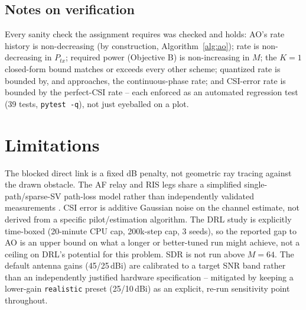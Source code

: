 \documentclass[conference]{IEEEtran}
\newcommand{\IRS}{RIS}
\begin{document}
\subsection{Notes on verification}
\label{sec:method-notes}
Every sanity check the assignment requires was checked and holds: AO's
rate history is non-decreasing (by construction, Algorithm~\ref{alg:ao});
rate is non-decreasing in $P_{tx}$; required power (Objective B) is
non-increasing in $M$; the $K{=}1$ closed-form bound matches or exceeds
every other scheme; quantized rate is bounded by, and approaches, the
continuous-phase rate; and CSI-error rate is bounded by the perfect-CSI
rate -- each enforced as an automated regression test (39 tests,
\texttt{pytest -q}), not just eyeballed on a plot.

\section{Limitations}
The blocked direct link is a fixed dB penalty, not geometric ray
tracing against the drawn obstacle. The AF relay and \IRS{} legs share a
simplified single-path/sparse-SV path-loss model rather than
independently validated measurements \cite{tang2021pathloss}. CSI error
is additive Gaussian noise on the channel estimate, not derived from a
specific pilot/estimation algorithm. The DRL study is explicitly
time-boxed (20-minute CPU cap, 200k-step cap, 3 seeds), so the reported
gap to AO is an upper bound on what a longer or better-tuned run might
achieve, not a ceiling on DRL's potential for this problem. SDR is not
run above $M{=}64$. The default antenna gains (45/25\,dBi) are
calibrated to a target SNR band rather than an independently justified
hardware specification -- mitigated by keeping a lower-gain
\texttt{realistic} preset (25/10\,dBi) as an explicit, re-run
sensitivity point throughout.
\end{document}
